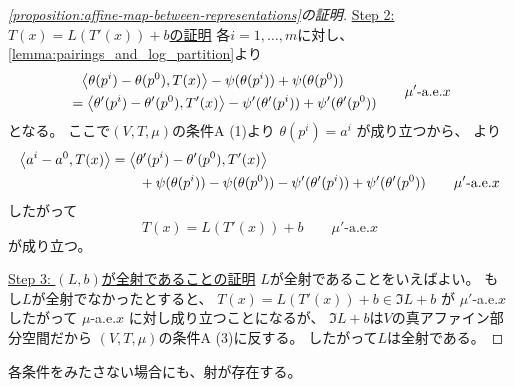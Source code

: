 \documentclass[report]{jlreq}
\begin{document}
\begin{proof}[\cref{proposition:affine-map-between-representations}の証明]
    \uline{Step 2: $T(x) = L(T'(x)) + b$の証明} \quad
    各$i = 1, \dots, m$に対し、
    \cref{lemma:pairings_and_log_partition}より
    \begin{equation}
        \begin{alignedat}{1}
            &\phantom{=}
                \myangle{\theta(p^i) - \theta(p^0)}{T(x)}
                - \psi(\theta(p^i))
                + \psi(\theta(p^0))
                \\
            &=
                \myangle{\theta'(p^i) - \theta'(p^0)}{T'(x)}
                - \psi'(\theta'(p^i))
                + \psi'(\theta'(p^0))
        \end{alignedat}
        \qquad
        \text{$\mu'$-a.e.$x$}
        \locallabel{eq:1}
    \end{equation}
    となる。
    ここで$(V, T, \mu)$の条件A (1)より
    $\theta(p^i) = a^i$
    が成り立つから、
    より
    \begin{equation}
        \begin{alignedat}{1}
            \left\langle{a^i - a^0},{T(x)}\right\rangle
                &=
                    \left\langle{\theta'(p^i) - \theta'(p^0)},{T'(x)}\right\rangle
                    \\
                &\qquad
                    + \psi(\theta(p^i))
                    - \psi(\theta(p^0))
                    - \psi'(\theta'(p^i))
                    + \psi'(\theta'(p^0))
                    \qquad
                    \text{$\mu'$-a.e.$x$}
        \end{alignedat}
    \end{equation}
    したがって
    \begin{equation}
        T(x) = L(T'(x)) + b
            \qquad
            \text{$\mu'$-a.e.$x$}
    \end{equation}
    が成り立つ。

    \uline{Step 3: $(L, b)$が全射であることの証明} \quad
    $L$が全射であることをいえばよい。
    もし$L$が全射でなかったとすると、
    $T(x) = L(T'(x)) + b \in \Im L + b$
    が
    $\mu'$-a.e.$x$
    したがって
    $\mu$-a.e.$x$
    に対し成り立つことになるが、
    $\Im L + b$は$V$の真アファイン部分空間だから
    $(V, T, \mu)$の条件A (3)に反する。
    したがって$L$は全射である。
\end{proof}

各条件をみたさない場合にも、射が存在する。

\end{document}
